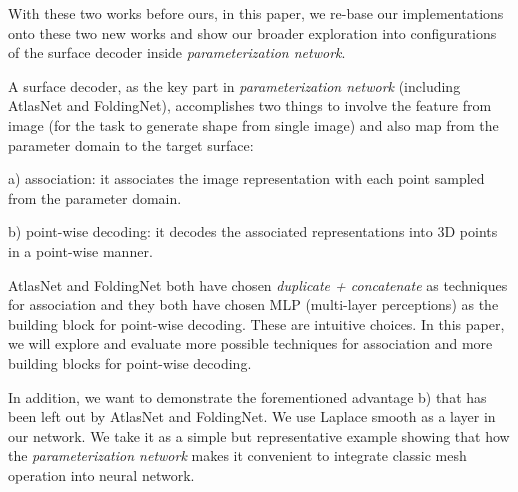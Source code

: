 {With these two works before ours, in this paper, we re-base our implementations onto these two new works and show our broader exploration into configurations of the surface decoder inside \emph{parameterization network}.

A surface decoder, as the key part in \emph{parameterization network} (including AtlasNet\cite{atlasnet} and FoldingNet\cite{foldingnet}), accomplishes two things to involve the feature from image (for the task to generate shape from single image) and also map from the parameter domain to the target surface:
 
a) association: it associates the image representation with each point sampled from the parameter domain. 
 
b) point-wise decoding: it decodes the associated representations into 3D points in a point-wise manner.
 
 AtlasNet\cite{atlasnet} and FoldingNet\cite{foldingnet} both have chosen \emph{duplicate + concatenate} as techniques for association and they both have chosen MLP (multi-layer perceptions) as the building block for point-wise decoding.
These are intuitive choices. In this paper, we will explore and evaluate more possible techniques for association and more building blocks for point-wise decoding.

In addition, we want to demonstrate the forementioned advantage b) that has been left out by AtlasNet\cite{atlasnet} and FoldingNet\cite{foldingnet}. We use Laplace smooth as a layer in our network. We take it as a simple but representative example showing that how the \emph{parameterization network} makes it convenient to integrate classic mesh operation into neural network. 
}


 
